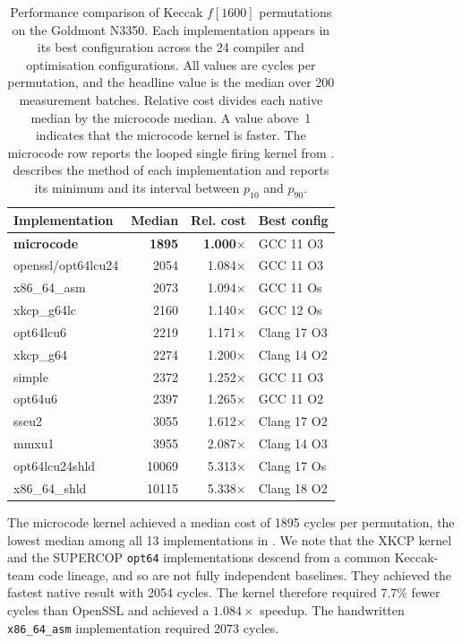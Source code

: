 \documentclass[journal=tches,submission]{iacrtrans}
\begin{document}
\begin{table}[htbp]
\centering
\caption{Performance comparison of Keccak $f[1600]$ permutations on the Goldmont N3350.
Each implementation appears in its best configuration across the 24 compiler and optimisation configurations.
All values are cycles per permutation, and the headline value is the median over 200 measurement batches.
Relative cost divides each native median by the microcode median.
A value above~1 indicates that the microcode kernel is faster. 
The microcode row reports the looped single firing kernel from .
 describes the method of each implementation and
reports its minimum and its interval between $p_{10}$ and $p_{90}$.}
\label{tab:results-keccak}
\footnotesize
\setlength{\tabcolsep}{4pt}
\begin{tabular}{@{}lrrl@{}}
\toprule
Implementation & Median & Rel. cost & Best config \\
\midrule
\textbf{microcode} & \textbf{1895} & \textbf{1.000$\times$} & GCC 11 O3 \\
\midrule
openssl/opt64lcu24            & 2054 & 1.084$\times$ & GCC 11 O3 \\
x86\_64\_asm      & 2073 & 1.094$\times$ & GCC 11 Os \\
xkcp\_g64lc       & 2160 & 1.140$\times$ & GCC 12 Os \\
opt64lcu6         & 2219 & 1.171$\times$ & Clang 17 O3 \\
xkcp\_g64         & 2274 & 1.200$\times$ & Clang 14 O2 \\
simple            & 2372 & 1.252$\times$ & GCC 11 O3 \\
opt64u6           & 2397 & 1.265$\times$ & GCC 11 O2 \\
sseu2             & 3055 & 1.612$\times$ & Clang 17 O2 \\
mmxu1             & 3955 & 2.087$\times$ & Clang 14 O3 \\
opt64lcu24shld    & 10069 & 5.313$\times$ & Clang 17 Os \\
x86\_64\_shld     & 10115 & 5.338$\times$ & Clang 18 O2 \\
\bottomrule
\end{tabular}
\end{table}

The microcode kernel achieved a median cost of 1895 cycles per permutation, the lowest median among all 13 implementations in . 
We note that the XKCP kernel and the SUPERCOP \texttt{opt64} implementations descend from a common Keccak-team code lineage, and so are not fully independent baselines. 
They achieved the fastest native result with 2054 cycles.
The kernel therefore required 7.7\% fewer cycles than OpenSSL and achieved a $1.084\times$ speedup.
The handwritten \texttt{x86\_64\_asm} implementation required 2073 cycles.
\end{document}
